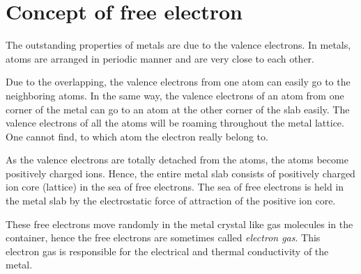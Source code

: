 \documentclass[15pt]{article}
\begin{document}
\section*{Concept of free electron}

The outstanding properties of metals are due to the valence electrons. In metals, atoms are arranged in periodic manner and are very close to each other.
\vspace{0.2cm}

Due to the overlapping, the valence electrons from one atom can easily go to the neighboring atoms. In the same way, the valence electrons of an atom from one corner of the metal can go to an atom at the other corner of the slab easily. The valence electrons of all the atoms will be roaming throughout the metal lattice. One cannot find, to which atom the electron really belong to.
\vspace{0.2cm}

As the valence electrons are totally detached from the atoms, the atoms become positively charged ions. Hence, the entire metal slab consists of positively charged ion core (lattice) in the sea of free electrons. The sea of free electrons is held in the metal slab by the electrostatic force of attraction of the positive ion core.
\vspace{0.2cm}

These free electrons move randomly in the metal crystal like gas molecules in the container, hence the free electrons are sometimes called \textit{electron gas}. This electron gas is responsible for the electrical and thermal conductivity of the metal.

\newpage
\end{document}
